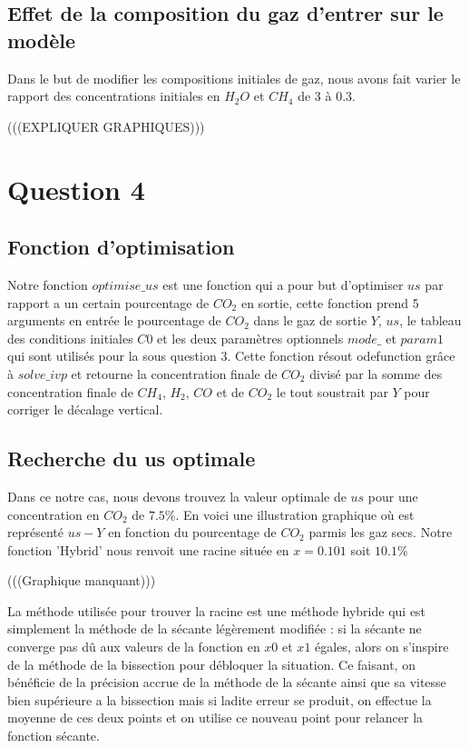 \documentclass[11pt]{report}
\newcommand{\mychapter}[2]{
    \setcounter{chapter}{#1}
    \setcounter{section}{0}
    \chapter*{#2}
    \addcontentsline{toc}{chapter}{#2}
}
\begin{document}
        \section{Effet de la composition du gaz d'entrer sur le modèle}
            Dans le but de modifier les compositions initiales de gaz,
            nous avons fait varier le rapport des concentrations initiales en $H_2O$ et $CH_4$ de $3$ à $0.3$.
            \par
            (((EXPLIQUER GRAPHIQUES)))

    \mychapter{4}{Question 4}
        \section{Fonction d'optimisation}
            Notre fonction $optimise\_us$ est une fonction qui a pour but d'optimiser $us$
            par rapport a un certain pourcentage de $CO_2$ en sortie,
            cette fonction prend 5 arguments en entrée le pourcentage de $CO_2$ dans
            le gaz de sortie $Y$, $us$, le tableau des conditions initiales $C0$ et
            les deux paramètres optionnels $mode\_$ et $param1$ qui sont utilisés pour la sous question 3.
            Cette fonction résout odefunction grâce à $solve\_ivp$ et retourne la concentration
            finale de $CO_2$ divisé par la somme des concentration finale de $CH_4$, $H_2$,
            $CO$ et de $CO_2$ le tout soustrait par $Y$ pour corriger le décalage vertical.
        \section{Recherche du us optimale}
            Dans ce notre cas, nous devons trouvez la valeur optimale de $us$ pour une concentration
            en $CO_2$ de $7.5\%$.
            En voici une illustration graphique où est représenté $us - Y$ en fonction
            du pourcentage de $CO_2$ parmis les gaz secs. Notre fonction 'Hybrid'
            nous renvoit une racine située en $x = 0.101$ soit $10.1\%$

            (((Graphique manquant)))

            La méthode utilisée pour trouver la racine est une méthode hybride qui est simplement
            la méthode de la sécante légèrement modifiée : si la sécante ne converge pas dû aux
            valeurs de la fonction en $x0$ et $x1$ égales,
            alors on s'inspire de la méthode de la bissection pour  débloquer la situation.
            Ce faisant, on bénéficie de la précision accrue de la méthode de la sécante
            ainsi que sa vitesse bien supérieure a la bissection mais si ladite erreur se produit,
            on effectue la moyenne de ces deux points et on utilise ce nouveau point pour relancer
            la fonction sécante.
\end{document}

